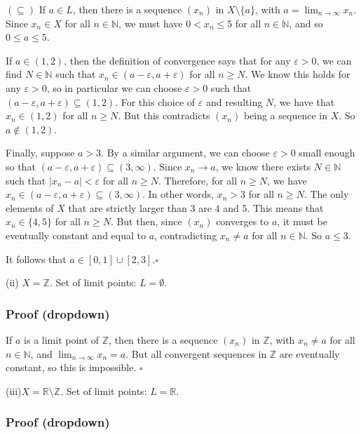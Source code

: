 \documentclass[letterpaper,10pt,english]{jupyterBook}
\begin{document}
\sphinxAtStartPar
\((\subseteq)\) If \(a\in L\), then there is a sequence \((x_n)\) in \(X\setminus\{a\}\), with \(a=\lim_{n\rightarrow\infty}x_n\). Since \(x_n\in X\) for all \(n\in\mathbb{N}\), we must have \(0<x_n\leq 5\) for all \(n\in\mathbb{N}\), and so \(0\leq a\leq 5\).

\sphinxAtStartPar
If \(a\in(1,2)\), then the definition of convergence says that for any \(\varepsilon>0\), we can find \(N\in\mathbb{N}\) such that \(x_n\in(a-\varepsilon,a+\varepsilon)\) for all \(n\geq N\). We know this holds for any \(\varepsilon>0\), so in particular we can choose \(\varepsilon>0\) such that \((a-\varepsilon,a+\varepsilon)\subseteq(1,2)\). For this choice of \(\varepsilon\) and resulting \(N\), we have that \(x_n\in(1,2)\) for all \(n\geq N\). But this contradicts \((x_n)\) being a sequence in \(X\). So \(a\notin (1,2)\).

\sphinxAtStartPar
Finally, suppose \(a>3\). By a similar argument, we can choose \(\varepsilon>0\) small enough so that \((a-\varepsilon,a+\varepsilon)\subseteq(3,\infty)\). Since \(x_n\rightarrow a\), we know there exists \(N\in\mathbb{N}\) such that \(|x_n-a|<\varepsilon\) for all \(n\geq N\). Therefore, for all \(n\geq N\), we have \(x_n\in(a-\varepsilon,a+\varepsilon)\subseteq (3,\infty)\). In other words, \(x_n>3\) for all \(n\geq N\). The only elements of \(X\) that are strictly larger than \(3\) are \(4\) and \(5\). This means that \(x_n\in\{4,5\}\) for all \(n\geq N\). But then, since \((x_n)\) converges to \(a\), it must be eventually constant and equal to \(a\), contradicting \(x_n\neq a\) for all \(n\in\mathbb{N}\). So \(a\leq 3\).

\sphinxAtStartPar
It follows that \(a\in[0,1]\cup[2,3]\).\(\square\)

\sphinxAtStartPar
(ii)  \(X=\mathbb{Z}\). Set of limit points: \(L=\emptyset\).
\subsubsection*{Proof (dropdown)}

\sphinxAtStartPar
If \(a\) is a limit point of \(\mathbb{Z}\), then there is a sequence \((x_n)\) in \(\mathbb{Z}\), with \(x_n\neq a\) for all \(n\in\mathbb{N}\), and \(\lim_{n\rightarrow\infty}x_n=a\). But all convergent sequences in \(\mathbb{Z}\) are eventually constant, so this is impossible.  \(\square\)

\sphinxAtStartPar
(iii)\(X=\mathbb{R}\setminus\mathbb{Z}\). Set of limit points:  \(L=\mathbb{R}\).
\subsubsection*{Proof (dropdown)}
\end{document}
